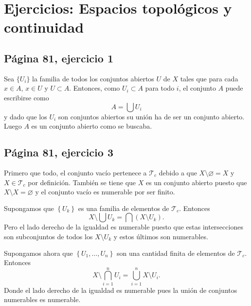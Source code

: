 \documentclass[mid,fleqn,final,oneside]{tareas}
\begin{document}
\chapter[Ejercicios: Espacios topológicos y continuidad]{Ejercicios: Espacios topológicos y continuidad}%
\label{cha:ejercicios_sobre_espacios_topológicos}

\reversemarginpar{}
\vspace{-.3\baselineskip}
\section*{Página 81, ejercicio 1}%

Sea $ \{ U_i \} $ la familia de todos los conjuntos
abiertos $ U $ de $X$ tales que para cada $x\in A$,
$x\in U$ y $U\subset A$.  Entonces, como $ U_i\subset A
$ para todo $ i $, el conjunto $ A $ puede escribirse
como 
\[ A=\bigcup U_i \] 
y dado que los $ U_i $ son
conjuntos abiertos su unión ha de ser un conjunto
abierto.  Luego $ A $ es un conjunto abierto como se
buscaba.

\section*{Página 81, ejercicio 3}%

Primero que todo, el conjunto vacío pertenece a $
\mathcal{T}_c $ debido a que $ X\setminus\varnothing=X
$ y $X\in \mathcal{T}_c$ por definición.  También se
tiene que $ X $ es un conjunto abierto puesto que $
X\setminus X=\varnothing $ y el conjunto vacío es
numerable por ser finito.

\reversemarginpar{} 
Supongamos que $
\left\{ U_k \right\}$ es una familia de elementos de $
\mathcal{T}_c $.  Entonces 
\[
	X\setminus\bigcup U_k= \bigcap (X\setminus U_k).
\]
\normalmarginpar{}%
Pero el lado derecho de la igualdad es numerable puesto
que estas intersecciones son subconjuntos de todos los
$ X\setminus U_k $ y estos últimos son numerables.

Supongamos ahora que $ \left\{ U_1,\dots,U_n \right\} $
son una cantidad finita de elementos de $
\mathcal{T}_c. $ Entonces
\[
	X\setminus\bigcap_{i=1}^{n}U_i =
	\bigcup_{i=1}^{n} X\setminus U_i.
\]
\normalmarginpar{}
Donde el lado derecho de la igualdad es numerable pues
la unión de conjuntos numerables es numerable.
\end{document}
